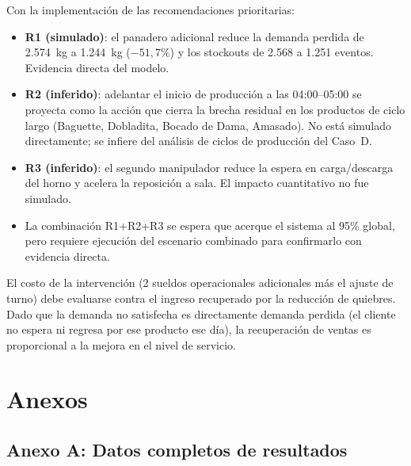 \documentclass[12pt]{article}
\begin{document}
Con la implementación de las recomendaciones prioritarias:

\begin{itemize}
  \item \textbf{R1 (simulado)}: el panadero adicional reduce la demanda perdida de 2.574~kg a 1.244~kg ($-51,7\%$) y los stockouts de 2.568 a 1.251 eventos. Evidencia directa del modelo.
  \item \textbf{R2 (inferido)}: adelantar el inicio de producción a las 04:00--05:00 se proyecta como la acción que cierra la brecha residual en los productos de ciclo largo (Baguette, Dobladita, Bocado de Dama, Amasado). No está simulado directamente; se infiere del análisis de ciclos de producción del Caso~D.
  \item \textbf{R3 (inferido)}: el segundo manipulador reduce la espera en carga/descarga del horno y acelera la reposición a sala. El impacto cuantitativo no fue simulado.
  \item La combinación R1+R2+R3 se espera que acerque el sistema al 95\% global, pero requiere ejecución del escenario combinado para confirmarlo con evidencia directa.
\end{itemize}

El costo de la intervención (2 sueldos operacionales adicionales más el ajuste de turno) debe evaluarse contra el ingreso recuperado por la reducción de quiebres. Dado que la demanda no satisfecha es directamente demanda perdida (el cliente no espera ni regresa por ese producto ese día), la recuperación de ventas es proporcional a la mejora en el nivel de servicio.

\newpage
\section*{Anexos}

\subsection*{Anexo A: Datos completos de resultados}
\end{document}
